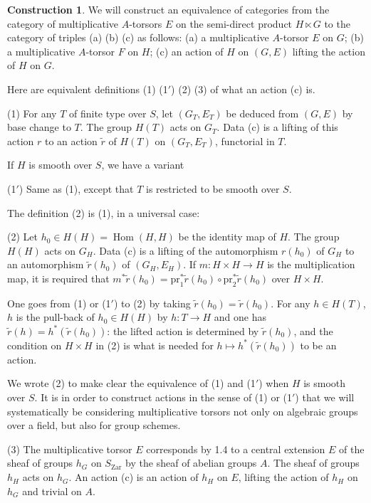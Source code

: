 \documentclass[11pt,a4paper]{article}
\theoremstyle{plain}
\theoremstyle{definition}
\newtheorem{construction}[theorem]{Construction}
\DeclareMathOperator{\Hom}{Hom}
\newcommand{\pr}{\mathrm{pr}}
\newcommand{\Zar}{\mathrm{Zar}}
\begin{document}
\begin{construction}
We will construct an equivalence of categories from the category of multiplicative $A$-torsors $E$ on the semi-direct product $H \ltimes G$ to the category of triples (a) (b) (c) as follows: (a) a multiplicative $A$-torsor $E$ on $G$; (b) a multiplicative $A$-torsor $F$ on $H$; (c) an action of $H$ on $(G,E)$ lifting the action of $H$ on $G$.

Here are equivalent definitions (1) (1$'$) (2) (3) of what an action (c) is.

(1) For any $T$ of finite type over $S$, let $(G_T, E_T)$ be deduced from $(G,E)$ by base change to $T$. The group $H(T)$ acts on $G_T$. Data (c) is a lifting of this action $r$ to an action $\tilde{r}$ of $H(T)$ on $(G_T, E_T)$, functorial in $T$.

If $H$ is smooth over $S$, we have a variant

(1$'$) Same as (1), except that $T$ is restricted to be smooth over $S$.

The definition (2) is (1), in a universal case:

(2) Let $h_0 \in H(H) = \Hom(H,H)$ be the identity map of $H$. The group $H(H)$ acts on $G_H$. Data (c) is a lifting of the automorphism $r(h_0)$ of $G_H$ to an automorphism $\tilde{r}(h_0)$ of $(G_H, E_H)$. If $m: H \times H \to H$ is the multiplication map, it is required that $m^*\tilde{r}(h_0) = \pr_1^*\tilde{r}(h_0) \circ \pr_2^*\tilde{r}(h_0)$ over $H \times H$.

One goes from (1) or (1$'$) to (2) by taking $\tilde{r}(h_0) = \tilde{r}(h_0)$. For any $h \in H(T)$, $h$ is the pull-back of $h_0 \in H(H)$ by $h: T \to H$ and one has $\tilde{r}(h) = h^*(\tilde{r}(h_0))$: the lifted action is determined by $\tilde{r}(h_0)$, and the condition on $H \times H$ in (2) is what is needed for $h \mapsto h^*(\tilde{r}(h_0))$ to be an action.

We wrote (2) to make clear the equivalence of (1) and (1$'$) when $H$ is smooth over $S$. It is in order to construct actions in the sense of (1) or (1$'$) that we will systematically be considering multiplicative torsors not only on algebraic groups over a field, but also for group schemes.

(3) The multiplicative torsor $E$ corresponds by 1.4 to a central extension $E$ of the sheaf of groups $h_G$ on $S_{\Zar}$ by the sheaf of abelian groups $A$. The sheaf of groups $h_H$ acts on $h_G$. An action (c) is an action of $h_H$ on $E$, lifting the action of $h_H$ on $h_G$ and trivial on $A$.
\end{construction}
\end{document}
